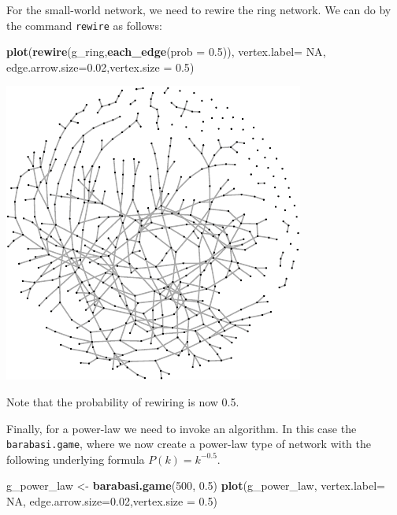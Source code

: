\documentclass[]{article}
\newenvironment{Shaded}{\begin{snugshade}}{\end{snugshade}}
\newcommand{\KeywordTok}[1]{\textcolor[rgb]{0.13,0.29,0.53}{\textbf{#1}}}
\newcommand{\DataTypeTok}[1]{\textcolor[rgb]{0.13,0.29,0.53}{#1}}
\newcommand{\DecValTok}[1]{\textcolor[rgb]{0.00,0.00,0.81}{#1}}
\newcommand{\FloatTok}[1]{\textcolor[rgb]{0.00,0.00,0.81}{#1}}
\newcommand{\StringTok}[1]{\textcolor[rgb]{0.31,0.60,0.02}{#1}}
\newcommand{\OtherTok}[1]{\textcolor[rgb]{0.56,0.35,0.01}{#1}}
\newcommand{\NormalTok}[1]{#1}
\theoremstyle{definition}
\theoremstyle{definition}
\theoremstyle{definition}
\theoremstyle{remark}
\begin{document}
For the small-world network, we need to rewire the ring network. We can
do by the command \texttt{rewire} as follows:

\begin{Shaded}
\begin{Highlighting}[]
\KeywordTok{plot}\NormalTok{(}\KeywordTok{rewire}\NormalTok{(g_ring,}\KeywordTok{each_edge}\NormalTok{(}\DataTypeTok{prob =} \FloatTok{0.5}\NormalTok{)), }\DataTypeTok{vertex.label=} \OtherTok{NA}\NormalTok{, }\DataTypeTok{edge.arrow.size=}\FloatTok{0.02}\NormalTok{,}\DataTypeTok{vertex.size =} \FloatTok{0.5}\NormalTok{)}
\end{Highlighting}
\end{Shaded}

\includegraphics{ResearchTools_files/figure-latex/unnamed-chunk-55-1.pdf}

Note that the probability of rewiring is now 0.5.

Finally, for a power-law we need to invoke an algorithm. In this case
the \texttt{barabasi.game}, where we now create a power-law type of
network with the following underlying formula \(P(k) = k^{-0.5}\).

\begin{Shaded}
\begin{Highlighting}[]
\NormalTok{g_power_law <-}\StringTok{ }\KeywordTok{barabasi.game}\NormalTok{(}\DecValTok{500}\NormalTok{, }\FloatTok{0.5}\NormalTok{)}
\KeywordTok{plot}\NormalTok{(g_power_law, }\DataTypeTok{vertex.label=} \OtherTok{NA}\NormalTok{, }\DataTypeTok{edge.arrow.size=}\FloatTok{0.02}\NormalTok{,}\DataTypeTok{vertex.size =} \FloatTok{0.5}\NormalTok{)}
\end{Highlighting}
\end{Shaded}
\end{document}
